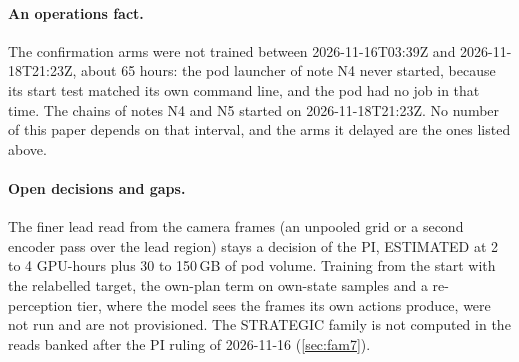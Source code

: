 \paragraph{An operations fact.} The confirmation arms were not trained between 2026-11-16T03:39Z and 2026-11-18T21:23Z, about 65 hours: the pod launcher of note N4 never started, because its start test matched its own command line, and the pod had no job in that time. The chains of notes N4 and N5 started on 2026-11-18T21:23Z. No number of this paper depends on that interval, and the arms it delayed are the ones listed above.

\paragraph{Open decisions and gaps.} The finer lead read from the camera frames (an unpooled grid or a second encoder pass over the lead region) stays a decision of the PI, ESTIMATED at 2 to 4 GPU-hours plus 30 to 150\,GB of pod volume. Training from the start with the relabelled target, the own-plan term on own-state samples and a re-perception tier, where the model sees the frames its own actions produce, were not run and are not provisioned. The STRATEGIC family is not computed in the reads banked after the PI ruling of 2026-11-16 (\cref{sec:fam7}).

